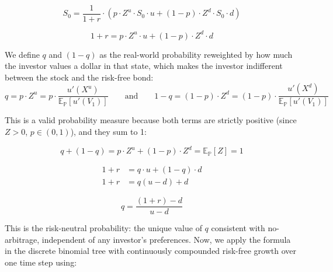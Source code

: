 \documentclass[hidelinks, 12pt, a4paper]{article}
\theoremstyle{definition}
\begin{document}
\begin{equation}
S_0 = \frac{1}{1+r} \cdot 
\left( 
p \cdot Z^u \cdot S_0 \cdot u 
+ (1-p) \cdot Z^d \cdot S_0 \cdot d 
\right)
\end{equation}



\begin{equation}
1 + r = p \cdot Z^u \cdot u 
+ (1-p) \cdot Z^d \cdot d
\tag{IV}
\end{equation}

\noindent We define $q$ and $(1-q)$ as the real-world probability reweighted 
by how much the investor values a dollar in that state, which makes the investor 
indifferent between the stock and the risk-free bond:
\begin{equation}
q = p \cdot Z^u
  = p \cdot 
  \frac{u'(X^u)}
       {\mathbb{E}_{\mathbb{P}}\!\left[u'(V_1)\right]}
\qquad \text{and} \qquad
1-q = (1-p) \cdot Z^d
       = (1-p) \cdot 
       \frac{u'(X^d)}
            {\mathbb{E}_{\mathbb{P}}\!\left[u'(V_1)\right]}
\end{equation}


\noindent This is a valid probability measure because both terms 
are strictly positive (since $Z > 0$, $p \in (0,1)$), and they sum to 1:

\begin{equation}
q + (1-q) 
  = p \cdot Z^u + (1-p) \cdot Z^d 
  = \mathbb{E}_{\mathbb{P}}[Z] = 1
\end{equation}



\begin{equation}
\begin{aligned}
1 + r &= q \cdot u + (1-q) \cdot d \\[4pt]
1 + r &= q(u - d) + d
\end{aligned}
\end{equation}

\begin{equation}
\boxed{q = \frac{(1+r) - d}{u - d}}
\end{equation}



\noindent This is the risk-neutral probability: the unique value of $q$ consistent with no-arbitrage, independent of any investor's preferences. 
Now, we apply the formula in the discrete binomial tree with continuously compounded risk-free growth over one time step using:
\end{document}
